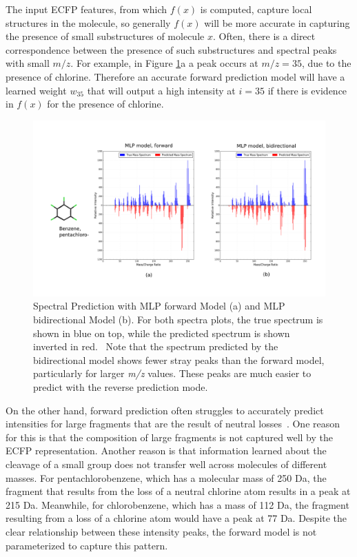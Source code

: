 \documentclass{article}
\begin{document}
The input ECFP features, from which $f(x)$ is computed, capture local structures in the molecule, so generally $f(x)$ will be more accurate in capturing the presence of small substructures of molecule $x$. Often, there is a direct correspondence between the presence of such substructures and spectral peaks with small $m/z$. For example, in Figure \ref{fig:MLP_improvement_spectra}a a peak occurs at $m/z = 35$, due to the presence of chlorine. Therefore an accurate forward prediction model will have a learned weight $w_{35}$ that will output a high intensity at $i = 35$ if there is evidence in $f(x)$ for the presence of chlorine. 

\begin{figure}[ht]
    \centering
    \includegraphics[width=0.9\linewidth]{./CEOCDNVZRAIOQZ-UHFFFAOYSA-N_mlp_model_spectra.png}
        \caption[Sample Spectra Prediction]{Spectral Prediction with MLP forward Model (a) and MLP bidirectional Model (b). For both spectra plots, the true spectrum is shown in blue on top, while the predicted spectrum is shown inverted in red. ~Note that the spectrum predicted by the bidirectional model shows fewer stray peaks than the forward model, particularly for larger \textit{m/z} values. These peaks are much easier to predict with the reverse prediction mode.}
    \label{fig:MLP_improvement_spectra}
\end{figure}


On the other hand, forward prediction often struggles to accurately predict intensities for large fragments that are the result of neutral losses~\cite{stein1995ChemicalSubstructureIdentification}. One reason for this is that the composition of large fragments is not captured well by the ECFP representation. Another reason is that information learned about the cleavage of a small group does not transfer well across molecules of different masses. For pentachlorobenzene, which has a molecular mass of 250 Da, the fragment that results from the loss of a neutral chlorine atom results in a peak at 215 Da. Meanwhile, for chlorobenzene, which has a mass of 112 Da, the fragment resulting from a loss of a chlorine atom would have a peak at 77 Da. Despite the clear relationship between these intensity peaks, the forward model is not parameterized to capture this pattern.
\end{document}

